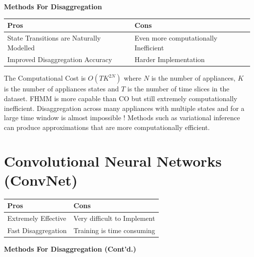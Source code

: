 \documentclass[landscape,fontscale=0.48,margin=2cm,paperwidth=135truecm,paperheight=89truecm]{baposter}
\begin{document}
\begin{poster}
\begin{posterbox}[column=1, height = bottom]{\LARGE \bfseries Methods For Disaggregation}
\vspace{1em}
\begin{tabularx}{\linewidth}{X|X}
  \hline
  \bf Pros & \bf Cons \\
  \hline
  \small State Transitions are Naturally Modelled & \small Even more computationally Inefficient\\
  \small Improved Disaggregation Accuracy & \small Harder Implementation\\
  \hline
\end{tabularx}

\vspace{6pt}
The Computational Cost is $O(TK^{2N})$ where $N$ is the number of appliances, $K$ is the number of appliances states and $T$ is the number of time slices in the dataset. FHMM is more capable than CO but still extremely computationally inefficient. Disaggregation across many appliances with multiple states and for a large time window is almost impossible ! Methods such as variational inference can produce approximations that are more computationally efficient. 


\section*{Convolutional Neural Networks (ConvNet)}

\vspace{1em}
\begin{tabularx}{\linewidth}{X|X}
  \hline
  \bf Pros & \bf Cons \\
  \hline
  \small Extremely Effective & \small Very difficult to Implement\\
  \small Fast Disaggregation & \small Training is time consuming\\
  \hline
\end{tabularx}
\end{posterbox}

%
\begin{posterbox}[column=2]{\LARGE \bfseries Methods For Disaggregation (Cont'd.)}

\end{posterbox}
\end{poster}
\end{document}
